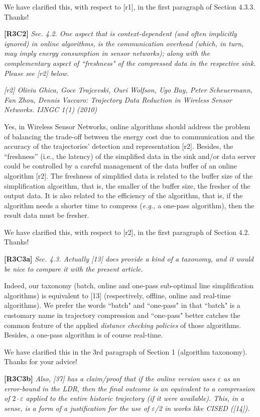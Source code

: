 \documentclass{letter}
\newcommand{\eg}{\emph{e.g.,}\xspace}
\begin{document}
We have clarified this, with respect to [r1], in the first paragraph of Section 4.3.3. Thanks!

\textbf{[R3C2]} \emph{
Sec. 4.2. One aspect that is context-dependent (and often implicitly ignored) in online algorithms, is the communication overhead (which, in turn, may imply energy consumption in sensor networks); along with the complementary aspect of ``freshness" of the compressed data in the respective sink. Please see [r2] below.}

\emph{[r2] Oliviu Ghica, Goce Trajcevski, Ouri Wolfson, Ugo Buy, Peter Scheuermann, Fan Zhou, Dennis Vaccaro: Trajectory Data Reduction in Wireless Sensor Networks. IJNGC 1(1) (2010)
}

{Yes, in Wireless Sensor Networks, online algorithms should address the problem of balancing the trade-off between the energy cost due to communication and the accuracy of the trajectories’ detection and representation [r2].} Besides, the ``freshness” (i.e., the latency) of the simplified data in the sink and/or data server could be controlled by a careful management of the data buffer of an online algorithm [r2]. The freshness of simplified data is related to the buffer size of the simplification algorithm, that is, the smaller of the buffer size, the fresher of the output data. It is also related to the efficiency of the algorithm, that is, if the algorithm needs a shorter time to compress (\eg a one-pass algorithm), then the result data must be fresher.

We have clarified this, with respect to [r2], in the first paragraph of Section 4.2. 
Thanks!

\textbf{[R3C3a]} \emph{
Sec. 4.3. Actually [13] does provide a kind of a taxonomy, and it would be nice to compare it with the present article. }

Indeed, our taxonomy (batch, online and one-pass sub-optimal line simplification algorithms) is equivalent to [13] (respectively, offline, online and real-time algorithms). 
We prefer the words ``batch" and ``one-pass" in that ``batch" is a customary name in trajectory compression and ``one-pass" better catches the common feature of the applied \emph{distance checking policies} of those algorithms. Besides, a one-pass algorithm is of course real-time.

We have clarified this in the 3rd paragraph of Section 1 (algorithm taxonomy). 
Thanks for your advice!

\textbf{[R3C3b]} \emph{Also, [37] has a claim/proof that if the online version uses $\varepsilon$ as an error-bound in the LDR, then the final outcome is an equivalent to a compression of $2 \cdot \varepsilon$ applied to the entire historic trajectory (if it were available). This, in a sense, is a form of a justification for the use of $\varepsilon$/2 in works like CISED ([14]).}
\end{document}
